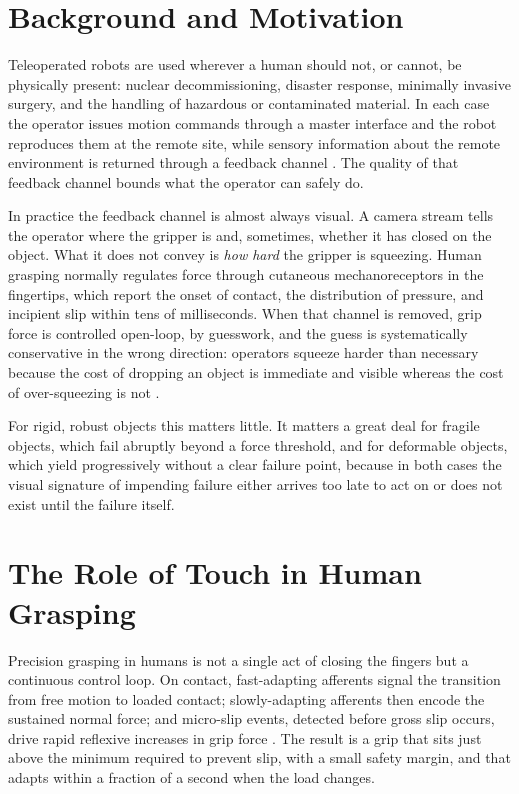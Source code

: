 \documentclass[12pt, a4paper, twoside, openright]{report}
\begin{document}
\section{Background and Motivation}
\label{sec:background}

Teleoperated robots are used wherever a human should not, or cannot, be
physically present: nuclear decommissioning, disaster response, minimally
invasive surgery, and the handling of hazardous or contaminated material. In
each case the operator issues motion commands through a master interface and
the robot reproduces them at the remote site, while sensory information about
the remote environment is returned through a feedback channel \cite{zheng2024,huang2019}. The quality of
that feedback channel bounds what the operator can safely do.

In practice the feedback channel is almost always visual. A camera stream tells
the operator where the gripper is and, sometimes, whether it has closed on the
object. What it does not convey is \emph{how hard} the gripper is squeezing.
Human grasping normally regulates force through cutaneous mechanoreceptors in
the fingertips, which report the onset of contact, the distribution of pressure,
and incipient slip within tens of milliseconds. When that channel is removed,
grip force is controlled open-loop, by guesswork, and the guess is
systematically conservative in the wrong direction: operators squeeze harder
than necessary because the cost of dropping an object is immediate and visible
whereas the cost of over-squeezing is not \cite{huang2019}.

For rigid, robust objects this matters little. It matters a great deal for
fragile objects, which fail abruptly beyond a force threshold, and for
deformable objects, which yield progressively without a clear failure point,
because in both cases the visual signature of impending failure either arrives
too late to act on or does not exist until the failure itself.

\section{The Role of Touch in Human Grasping}
\label{sec:role-of-touch}

Precision grasping in humans is not a single act of closing the fingers but a
continuous control loop. On contact, fast-adapting afferents signal the
transition from free motion to loaded contact; slowly-adapting afferents then
encode the sustained normal force; and micro-slip events, detected before gross
slip occurs, drive rapid reflexive increases in grip force \cite{johansson2009}. The result is a grip
that sits just above the minimum required to prevent slip, with a small safety
margin, and that adapts within a fraction of a second when the load changes.
\end{document}
